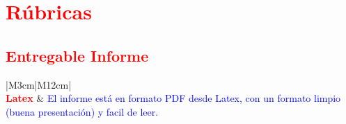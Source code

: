 \documentclass{article}
\begin{document}
\section{\textcolor{red}{Rúbricas}}

\subsection{\textcolor{red}{Entregable Informe}}
\begin{table}[H]
	\caption{Tipo de Informe}
	\setlength{\tabcolsep}{0.5em} %
	{\renewcommand{\arraystretch}{1.5}%
		\begin{tabular}{|M{3cm}|M{12cm}|}
			\hline
			                                                                                                      \\
			\hline
			\textbf{\textcolor{red}{Latex}} & \textcolor{blue}{El informe está en formato PDF desde Latex,  con un formato limpio (buena presentación) y facil de leer.} \\
			\hline
		\end{tabular}
	}
\end{table}
\end{document}
